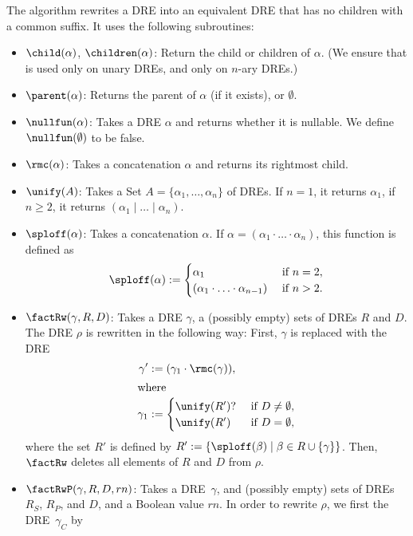 \documentclass[a4paper,11pt, svgnames,titlepage]{article}
\newcommand{\rxo}{\mathtt{?}}
\newcommand{\rxc}{\cdot}
\DeclareMathOperator{\ror}{\mathtt{|}}
\newcommand{\df}{:=}
\begin{document}
The algorithm \factorOut rewrites a DRE into an equivalent DRE that has no children with a common suffix. It  uses the following subroutines:
\begin{itemize}
	\item $\child(\alpha)$, $\children(\alpha)$: Return the child or children of $\alpha$. (We ensure that \child is used only on unary DREs, and \children only on $n$-ary DREs.)
	\item $\parent(\alpha)$: Returns the parent of $\alpha$ (if it exists), or $\emptyset$.
	\item $\nullfun(\alpha)$: Takes a DRE $\alpha$ and returns whether it is nullable. We define $\nullfun(\emptyset)$ to be false.
	\item $\rmc(\alpha)$: Takes a concatenation $\alpha$ and returns its rightmost child.
	\item $\unify(A)$: Takes a Set $A=\{\alpha_1,\ldots,\alpha_n\}$ of DREs. If $n=1$, it returns $\alpha_1$, if $n\geq 2$, it returns $(\alpha_1\ror\ldots\ror\alpha_n)$.
	\item $\sploff(\alpha)$: Takes a concatenation $\alpha$. If $\alpha=(\alpha_1\rxc\ldots\rxc \alpha_n)$, this function is defined as
	\[\sploff(\alpha)\df \begin{cases}
		\alpha_1 & \text{ if $n=2$},\\
		(\alpha_1\rxc\ldots\rxc \alpha_{n-1})& \text{ if $n>2$.}
	\end{cases}\]
	\item $\factRw(\gamma,R,D)$: Takes a DRE $\gamma$, a (possibly empty) sets of DREs $R$ and $D$. The DRE $\rho$ is  rewritten in the following way: First, $\gamma$ is replaced with the DRE 
\begin{align*}
	\gamma'&\df (\gamma_1\rxc \rmc(\gamma)),\\
	\shortintertext{where}
	\gamma_1&\df \begin{cases}
		\unify(R')\rxo & \text{ if $D\neq \emptyset$,}\\
		\unify(R') & \text{ if $D=\emptyset$,}
	\end{cases}
\end{align*}
where the set $R'$ is defined by $R'\df\{\sploff(\beta)\mid \beta\in R\cup\{\gamma\}\}$. Then, $\factRw$ deletes all elements of $R$ and $D$ from $\rho$.
\item $\factRwP(\gamma,R,D,rn)$: Takes a DRE~$\gamma$, and (possibly empty) sets of DREs $R_S$, $R_P$, and $D$, and a Boolean value $rn$. In order to rewrite $\rho$, we first the DRE~$\gamma_{C}$ by
\begin{align*}

\end{align*}
\end{itemize}
\end{document}
